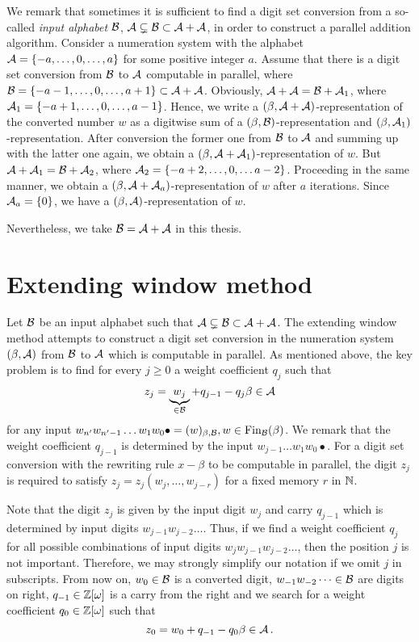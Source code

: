   We remark that sometimes it is sufficient to find a digit set conversion from a so-called \emph{input alphabet} $\mathcal{B}$, $\mathcal{A} \subsetneq \mathcal{B} \subset \mathcal{A}+\mathcal{A}$, in order to construct a parallel addition algorithm. Consider a numeration system with the alphabet $\mathcal{A}=\{-a, \dots, 0, \dots, a\}$ for some positive integer $a$. Assume that there is a digit set conversion from $\mathcal{B}$ to $\mathcal{A}$ computable in parallel, where $\mathcal{B}=\{-a-1, \dots, 0, \dots, a+1\}\subset\mathcal{A}+\mathcal{A}$. Obviously, $\mathcal{A}+\mathcal{A}=\mathcal{B} + \mathcal{A}_1$, where $\mathcal{A}_1=\{-a+1, \dots, 0, \dots, a-1\}$. Hence, we write a $(\beta, \mathcal{A}+\mathcal{A})$-representation of the converted number $w$ as a digitwise sum of a $(\beta, \mathcal{B})$-representation and $(\beta, \mathcal{A}_1)$-representation. After conversion the former one from $\mathcal{B}$ to $\mathcal{A}$ and summing up with the latter one again, we obtain a  $(\beta, \mathcal{A}+\mathcal{A}_1)$-representation of $w$. But $\mathcal{A}+\mathcal{A}_1=\mathcal{B} + \mathcal{A}_2$, where $\mathcal{A}_2=\{-a+2, \dots, 0, \dots a-2\}$. Proceeding in the same manner, we  obtain a  $(\beta, \mathcal{A}+\mathcal{A}_a)$-representation of $w$ after $a$ iterations. Since $\mathcal{A}_a=\{0\}$, we have a $(\beta, \mathcal{A})$-representation of $w$. 
  
  Nevertheless, we take $\mathcal{B}=\mathcal{A}+\mathcal{A}$ in this thesis.

\section{Extending window method}
\label{sec:methodDescription}
Let $\mathcal{B}$ be an input alphabet such that $\mathcal{A} \subsetneq \mathcal{B} \subset \mathcal{A}+\mathcal{A}$.
The extending window method attempts to construct a digit set conversion in the numeration system $(\beta,\mathcal{A})$ from $\mathcal{B}$ to $\mathcal{A}$ which is computable in parallel.
As mentioned above, the key problem is to find for every $j\geq 0$ a weight coefficient $q_j$ such that 
    $$
        z_j=\underbrace{w_j}_{\in \mathcal{B}} + q_{j-1} - q_j \beta \in \mathcal{A} 
    $$  
    for any input $w_{n'}w_{n'-1}\dots w_1 w_0 \bullet=(w)_{\beta,\mathcal{B}}, w\in \text{Fin}_{\mathcal{B}}(\beta)$. We remark that the weight coefficient $q_{j-1}$ is determined by the input $w_{j-1}\dots w_1 w_0 \bullet$. For a digit set conversion with the rewriting rule $x-\beta$ to be computable in parallel, the digit $z_j$ is required to satisfy $z_j=z_j(w_{j},\dots,w_{j-r})$ for a fixed memory $r$ in $\mathbb{N}$.
    
    Note that the digit $z_j$ is given by the input digit $w_j$ and carry $q_{j-1}$ which is determined by input digits  $w_{j-1} w_{j-2}\dots$. Thus, if we find a weight coefficient $q_j$ for all possible combinations of input digits $w_j w_{j-1} w_{j-2}\dots$, then the position $j$ is not important. Therefore, we may strongly simplify our notation if we omit $j$ in subscripts. From now on, $w_0\in\mathcal{B}$ is a converted digit, $w_{-1} w_{-2}\dots\in\mathcal{B}$ are digits on right, $q_{-1}\in\mathbb{Z}[\omega]$ is a carry from the right and we search for a weight coefficient $q_0\in\mathbb{Z}[\omega]$ such that 
    $$
    z_0=w_0 + q_{-1} - q_0 \beta \in \mathcal{A}\,.
    $$
    
